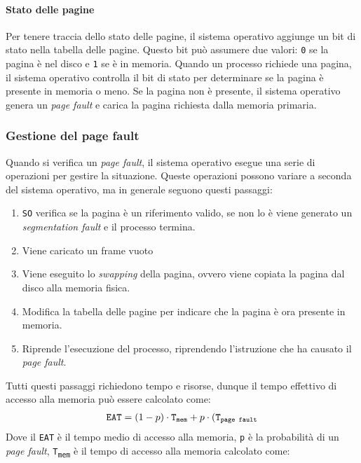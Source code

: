     \paragraph{Stato delle pagine} Per tenere traccia dello stato delle pagine, il sistema operativo aggiunge un bit di stato nella tabella delle pagine. Questo bit può assumere due valori: \texttt{0} se la pagina è nel disco e \texttt{1} se è in memoria. Quando un processo richiede una pagina, il sistema operativo controlla il bit di stato per determinare se la pagina è presente in memoria o meno. Se la pagina non è presente, il sistema operativo genera un \textit{page fault} e carica la pagina richiesta dalla memoria primaria.
    \subsubsection{Gestione del page fault} 
        Quando si verifica un \textit{page fault}, il sistema operativo esegue una serie di operazioni per gestire la situazione. Queste operazioni possono variare a seconda del sistema operativo, ma in generale seguono questi passaggi:
        \begin{enumerate}
            \item \texttt{SO} verifica se la pagina è un riferimento valido, se non lo è viene generato un \textit{segmentation fault} e il processo termina.
            \item Viene caricato un frame vuoto
            \item Viene eseguito lo \textit{swapping} della pagina, ovvero viene copiata la pagina dal disco alla memoria fisica.
            \item Modifica la tabella delle pagine per indicare che la pagina è ora presente in memoria.
            \item Riprende l'esecuzione del processo, riprendendo l'istruzione che ha causato il \textit{page fault}.
        \end{enumerate}
        Tutti questi passaggi richiedono tempo e risorse, dunque il tempo effettivo di accesso alla memoria può essere calcolato come:
        \begin{align*}
            \texttt{EAT} = (1-p) \cdot \texttt{T\textsubscript{mem}} + p \cdot (\texttt{T\textsubscript{page fault}}
        \end{align*}
        Dove il \texttt{EAT} è il tempo medio di accesso alla memoria, \texttt{p} è la probabilità di un \textit{page fault}, \texttt{T\textsubscript{mem}} è il tempo di accesso alla memoria calcolato come:
